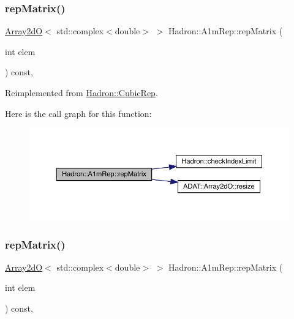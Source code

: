\subsubsection{\texorpdfstring{repMatrix()}{repMatrix()}\hspace{0.1cm}{\footnotesize\ttfamily [1/3]}}
{\footnotesize\ttfamily \mbox{\hyperlink{classADAT_1_1Array2dO}{Array2dO}}$<$ std\+::complex$<$double$>$ $>$ Hadron\+::\+A1m\+Rep\+::rep\+Matrix (\begin{DoxyParamCaption}\item[{int}]{elem }\end{DoxyParamCaption}) const\hspace{0.3cm}{\ttfamily [inline]}, {\ttfamily [virtual]}}



Reimplemented from \mbox{\hyperlink{structHadron_1_1CubicRep_ac5d7e9e6f4ab1158b5fce3e4ad9e8005}{Hadron\+::\+Cubic\+Rep}}.

Here is the call graph for this function\+:
\nopagebreak
\begin{figure}[H]
\begin{center}
\leavevmode
\includegraphics[width=350pt]{d3/dab/structHadron_1_1A1mRep_aa82be422dc6de780227bb8c42dfeab36_cgraph}
\end{center}
\end{figure}
\mbox{\label{structHadron_1_1A1mRep_aa82be422dc6de780227bb8c42dfeab36}} 
\subsubsection{\texorpdfstring{repMatrix()}{repMatrix()}\hspace{0.1cm}{\footnotesize\ttfamily [2/3]}}
{\footnotesize\ttfamily \mbox{\hyperlink{classADAT_1_1Array2dO}{Array2dO}}$<$ std\+::complex$<$double$>$ $>$ Hadron\+::\+A1m\+Rep\+::rep\+Matrix (\begin{DoxyParamCaption}\item[{int}]{elem }\end{DoxyParamCaption}) const\hspace{0.3cm}{\ttfamily [inline]}, {\ttfamily [virtual]}}



